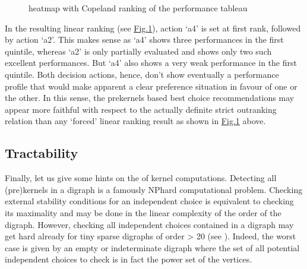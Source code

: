 \documentclass[a4paper,12pt,english]{sphinxhowto}
\let\sphinxpxdimen\pdfpxdimen\else\newdimen\sphinxpxdimen
\begin{document}
\begin{figure}[H]
\centering
\capstart

\noindent\sphinxincludegraphics[width=550\sphinxpxdimen]{{outrankingResult}.png}
\caption{heatmap with Copeland ranking of the performance tableau}\label{\detokenize{tutorial:outrankingresult}}\end{figure}

In the resulting linear ranking (see \hyperref[\detokenize{tutorial:outrankingresult}]{Fig.\@ \ref{\detokenize{tutorial:outrankingresult}}}), action ‘a4’ is set at first rank, followed by action ‘a2’. This makes sense as ‘a4’ shows three performances in the first quintile, whereas ‘a2’ is only partially evaluated and shows only two such excellent performances. But ‘a4’ also shows a very weak performance in the first quintile. Both decision actions, hence, don’t show eventually a performance profile that would make apparent a clear preference situation in favour of one or the other. In this sense, the prekernels based best choice recommendations may appear more faithful with respect to the actually definite strict outranking relation than any ‘forced’ linear ranking result as shown in \hyperref[\detokenize{tutorial:outrankingresult}]{Fig.\@ \ref{\detokenize{tutorial:outrankingresult}}} above.


\subsection{Tractability}
\label{\detokenize{tutorial:tractability}}
Finally, let us give some hints on the  of kernel computations. Detecting all (pre)kernels in a digraph is a famously NP\sphinxhyphen{}hard computational problem. Checking external stability conditions for an independent choice is equivalent to checking its maximality and may be done in the linear complexity of the order of the digraph. However, checking all independent choices contained in a digraph may get hard already for tiny sparse digraphs of order  \textgreater{} 20 (see ). Indeed, the worst case is given by an empty or indeterminate digraph where the set of all potential independent choices to check is in fact the power set of the vertices.
\end{document}
